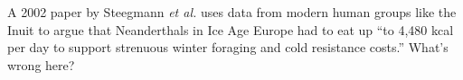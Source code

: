 A 2002 paper by Steegmann \emph{et al.} uses data from modern human
groups like the Inuit to argue that Neanderthals in Ice Age Europe had
to eat up ``to 4,480 kcal per day to support strenuous winter foraging
and cold resistance costs.'' What's wrong here?

